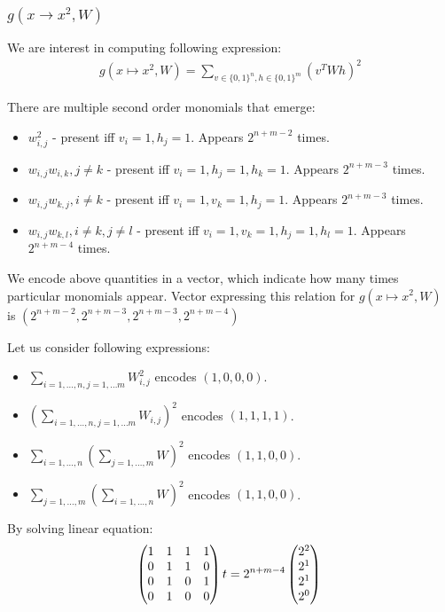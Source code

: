 \subsubsection{$g(x \rightarrow x^2, W)$}

We are interest in computing following expression: 
\begin{gather*}
	g(x \mapsto x^2, W) = \sum_{v \in \{0, 1\}^n, h \in \{0, 1\}^m} (v^TWh)^2
\end{gather*}

There are multiple second order monomials that emerge: 

\begin{itemize}
	\item $w_{i,j}^2$ - present iff $v_i = 1, h_j = 1$. Appears $2^{n + m - 2}$ times.
	\item $w_{i,j} w_{i, k}, j \neq k$ - present iff $v_i = 1, h_j = 1, h_k = 1$. Appears $2^{n + m - 3}$ times.	
	\item $w_{i,j} w_{k, j}, i \neq k$ - present iff $v_i = 1, v_k = 1, h_j = 1$. Appears $2^{n + m - 3}$ times.
	\item $w_{i,j} w_{k, l}, i \neq k, j \neq l$ - present iff $v_i = 1, v_k = 1, h_j = 1, h_l = 1$. Appears $2^{n + m - 4}$ times.			
\end{itemize}
We encode above quantities in a vector, which indicate how many times particular monomials 
appear. Vector expressing this relation for $g(x \mapsto x^2, W)$ is $(2^{n + m - 2}, 2^{n + m - 3}, 2^{n + m - 3}, 2^{n + m - 4})$


Let us consider following expressions: 
\begin{itemize}
 \item $\sum_{i = 1, \dots, n, j = 1, \dots m} W_{i, j}^2$ encodes $(1, 0, 0, 0)$. 
 \item $(\sum_{i = 1, \dots, n, j = 1, \dots m} W_{i, j})^2$ encodes $(1, 1, 1, 1)$.
 \item $\sum_{i = 1, \dots, n}(\sum_{j = 1, \dots, m} W)^2$ encodes $(1, 1, 0, 0)$. 
 \item $\sum_{j = 1, \dots, m}(\sum_{i = 1, \dots, n} W)^2$ encodes $(1, 1, 0, 0)$. 
\end{itemize}
 
 By solving linear equation:
 \begin{equation}
 \begin{pmatrix} 
  1 & 1 & 1 & 1 \\ 
  0 & 1 & 1 & 0 \\ 
  0 & 1 & 0 & 1 \\ 
  0 & 1 & 0 & 0 \\     
\end{pmatrix}t = 2^{n + m - 4}\begin{pmatrix} 
  2^{2}\\ 
  2^{1}\\ 
  2^{1}\\ 
  2^{0}\\     
\end{pmatrix} \\
 \end{equation}

